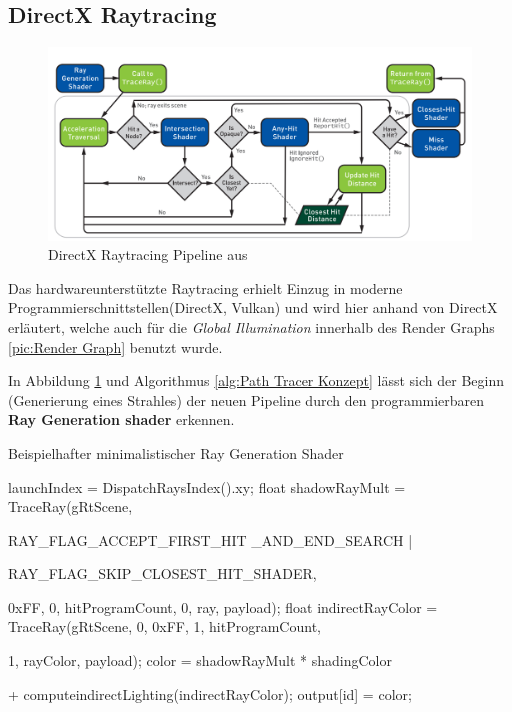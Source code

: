 \par 
\subsection{DirectX Raytracing}

\begin{figure}[H]
    \centering
    \includegraphics[width=\linewidth]{content/PathTracer/Bilder/DirectXRaytracingPipeline.png}
    \caption{DirectX Raytracing Pipeline aus \cite{Haines2019}}
    \label{pic:DirectXRaytracingPipeline}
\end{figure}

Das hardwareunterstützte Raytracing erhielt Einzug in moderne Programmierschnittstellen(DirectX, Vulkan) und wird 
hier anhand von DirectX erläutert, welche auch für die \textit{Global Illumination} innerhalb des 
Render Graphs \ref{pic:Render Graph} benutzt wurde. 

In Abbildung \ref{pic:DirectXRaytracingPipeline} und  Algorithmus \ref{alg:Path Tracer Konzept} lässt sich
der Beginn (Generierung eines Strahles) der neuen Pipeline durch den programmierbaren
\textbf{Ray Generation shader} erkennen.

\begin{tcolorbox}
\begin{algorithm}[H]
    \caption{Beispielhafter minimalistischer Ray Generation Shader}
    \begin{algorithmic}[1]
        \State launchIndex = DispatchRaysIndex().xy;
            \State float shadowRayMult = TraceRay(gRtScene,\par
            RAY\_FLAG\_ACCEPT\_FIRST\_HIT \_AND\_END\_SEARCH |\par
            RAY\_FLAG\_SKIP\_CLOSEST\_HIT\_SHADER,\par
            0xFF, 0, hitProgramCount, 0, ray, payload);
            \State float indirectRayColor = TraceRay(gRtScene, 0, 0xFF, 1, hitProgramCount,\par
            1, rayColor, payload);
            \State color = shadowRayMult * shadingColor \par
            + computeindirectLighting(indirectRayColor);
        \EndFor
        \State output[id] = color;
    \end{algorithmic}
    \label{alg:Ray Gen}
\end{algorithm}
\end{tcolorbox}

